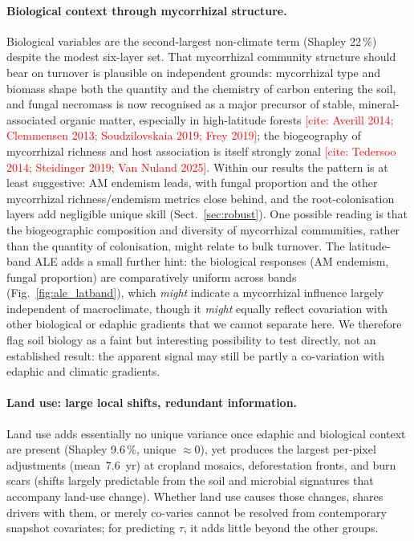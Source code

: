 \documentclass[12pt, a4paper]{article}
\newcommand{\PH}[1]{\textcolor{red}{#1}}
\begin{document}
\paragraph{Biological context through mycorrhizal structure.}
Biological variables are the second-largest non-climate term (Shapley 22\,\%) despite
the modest six-layer set. That mycorrhizal community structure should bear on turnover
is plausible on independent grounds: mycorrhizal type and biomass shape both the
quantity and the chemistry of carbon entering the soil, and fungal necromass is now
recognised as a major precursor of stable, mineral-associated organic matter,
especially in high-latitude forests \PH{[cite: Averill 2014; Clemmensen 2013;
Soudzilovskaia 2019; Frey 2019]}; the biogeography of mycorrhizal richness and
host association is itself strongly zonal \PH{[cite: Tedersoo 2014; Steidinger 2019;
Van Nuland 2025]}. Within our results the pattern is at least suggestive: AM
endemism leads, with fungal proportion and the other mycorrhizal richness/endemism
metrics close behind, and the root-colonisation layers add negligible unique skill
(Sect.~\ref{sec:robust}). One possible reading is that the biogeographic composition
and diversity of mycorrhizal communities, rather than the quantity of colonisation,
might relate to bulk turnover. The latitude-band ALE adds a small further hint: the
biological responses (AM endemism, fungal proportion) are comparatively uniform
across bands (Fig.~\ref{fig:ale_latband}), which \emph{might} indicate a mycorrhizal
influence largely independent of macroclimate, though it \emph{might} equally reflect
covariation with other biological or edaphic gradients that we cannot separate here.
We therefore flag soil biology as a faint but interesting possibility to test
directly, not an established result: the apparent signal may still be partly a
co-variation with edaphic and climatic gradients.

\paragraph{Land use: large local shifts, redundant information.}
Land use adds essentially no unique variance once edaphic and biological
context are present (Shapley 9.6\,\%, unique $\approx0$), yet produces the largest
per-pixel adjustments (mean~7.6~yr) at cropland mosaics, deforestation fronts, and
burn scars (shifts largely predictable from the soil and microbial signatures that
accompany land-use change). Whether land use causes those changes, shares drivers with
them, or merely co-varies cannot be resolved from contemporary snapshot covariates;
for predicting $\tau$, it adds little beyond the other groups.
\end{document}
